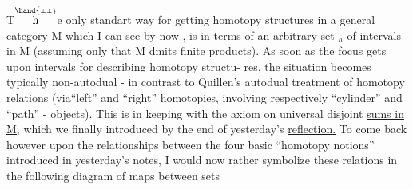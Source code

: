 T$\overset{\hand{\scriptscriptstyle\perp\perp}}{\mathrm h}$e only standart way for getting homotopy structures in a general
category M which I  can see by now , is in terms of an arbitrary
set \hand{\ensuremath{\Sigma}}$_{h}$ of intervals in M (assuming only that M dmits finite products).
As soon as the focus gets upon intervals for describing homotopy structu-%
res, the situation becomes typically non-autodual - in contrast to
Quillen's autodual treatment of homotopy relations (via``left'' and ``right''
homotopies, involving respectively ``cylinder'' and ``path'' - objects). 
This is in keeping with the  axiom on universal disjoint \uline{sums in M,} which
we finally introduced by the end of yesterday's \uline{reflection.} To come
back however upon the relationships between the four basic ``homotopy
notions'' introduced in yesterday's notes, I would now rather symbolize
these relations in the following diagram of maps between sets


